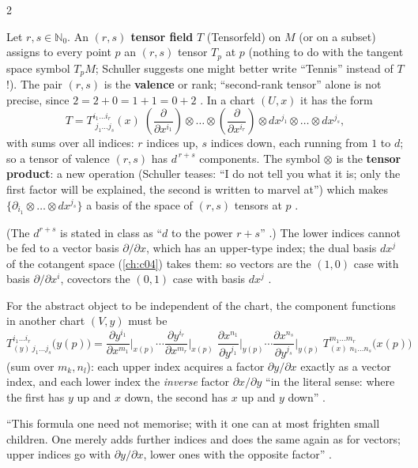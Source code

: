 \begin{paracol}{2}
\begin{definition}\label{def:tf-tensorfield}
Let $r,s\in\mathbb N_0$. An \textbf{$(r,s)$ tensor field} $T$ (Tensorfeld) on $M$ (or on a subset) assigns to every point $p$ an
$(r,s)$ tensor $T_p$ at $p$ (nothing to do with the tangent space symbol $T_pM$; Schuller suggests one might better write
``Tennis'' instead of $T$!). The pair $(r,s)$ is the \textbf{valence} or rank; ``second-rank tensor'' alone is not precise,
since $2=2+0=1+1=0+2$ .
In a chart $(U,x)$ it has the form
\[
  T=T^{i_1\dots i_r}_{\;j_1\dots j_s}(x)\;
  \left(\frac{\partial}{\partial x^{i_1}}\right)\otimes\dots\otimes\left(\frac{\partial}{\partial x^{i_r}}\right)\otimes
  d x^{j_1}\otimes\dots\otimes d x^{j_s},
\]
with sums over all indices: $r$ indices up, $s$ indices down, each running from $1$ to $d$; so a tensor of valence $(r,s)$ has
$d^{\,r+s}$ components. The symbol $\otimes$ is the \textbf{tensor product}: a new operation (Schuller teases: ``I do not tell you
what it is; only the first factor will be explained, the second is written to marvel at'') which makes
$\{\partial_{i_1}\otimes\dots\otimes dx^{j_s}\}$ a basis of the space of $(r,s)$ tensors at $p$
.
\end{definition}
(The $d^{r+s}$ is stated in class as ``$d$ to the power $r+s$'' .) The lower indices cannot be fed to a vector
basis $\partial/\partial x$, which has an upper-type index; the dual basis $dx^j$ of the cotangent space (\cref{ch:c04}) takes
them: so vectors are the $(1,0)$ case with basis $\partial/\partial x^i$, covectors the $(0,1)$ case with basis $dx^j$
.

\begin{theorem}\label{thm:tf-tensor-trafo}
For the abstract object to be independent of the chart, the component functions in another chart $(V,y)$ must be
\[
  T^{i_1\dots i_r}_{(y)\;j_1\dots j_s}\bigl(y(p)\bigr)
  =\frac{\partial y^{i_1}}{\partial x^{m_1}}\Big|_{x(p)}\!\!\cdots\frac{\partial y^{i_r}}{\partial x^{m_r}}\Big|_{x(p)}\;
   \frac{\partial x^{n_1}}{\partial y^{j_1}}\Big|_{y(p)}\!\!\cdots\frac{\partial x^{n_s}}{\partial y^{j_s}}\Big|_{y(p)}\;
   T^{m_1\dots m_r}_{(x)\;n_1\dots n_s}\bigl(x(p)\bigr)
\]
(sum over $m_k,n_l$): each upper index acquires a factor $\partial y/\partial x$ exactly as a vector index, and each lower index
the \emph{inverse} factor $\partial x/\partial y$ ``in the literal sense: where the first has $y$ up and $x$ down, the second has
$x$ up and $y$ down'' .
\end{theorem}
``This formula one need not memorise; with it one can at most frighten small children. One merely adds further indices and does
the same again as for vectors; upper indices go with $\partial y/\partial x$, lower ones with the opposite factor''
.


\end{paracol}
